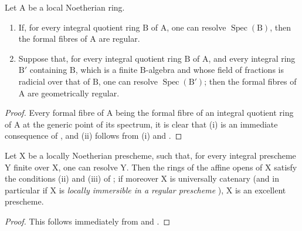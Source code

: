 \begin{corollary}[7.9.4]
\label{IV.7.9.4}
Let $\mathrm{A}$ be a local Noetherian ring.
\begin{enumerate}[label=(\roman*)]
  \item If, for every integral quotient ring $\mathrm{B}$ of $\mathrm{A}$, one can resolve $\operatorname{Spec}(\mathrm{B})$, then the formal fibres of $\mathrm{A}$ are regular.
  \item Suppose that, for every integral quotient ring $\mathrm{B}$ of $\mathrm{A}$, and every integral ring $\mathrm{B}'$ containing $\mathrm{B}$, which is a finite $\mathrm{B}$-algebra and whose field of fractions is radicial over that of $\mathrm{B}$, one can resolve $\operatorname{Spec}(\mathrm{B}')$; then the formal fibres of $\mathrm{A}$ are geometrically regular.
\end{enumerate}
\end{corollary}

\begin{proof}
Every formal fibre of $\mathrm{A}$ being the formal fibre of an integral quotient ring of $\mathrm{A}$ at the generic point of its spectrum, it is clear that (i) is an immediate consequence of , and (ii) follows from (i) and .
\end{proof}

\begin{proposition}[7.9.5]
\label{IV.7.9.5}
Let $\mathrm{X}$ be a locally Noetherian prescheme, such that, for every integral prescheme $\mathrm{Y}$ finite over $\mathrm{X}$, one can resolve $\mathrm{Y}$. Then the rings of the affine opens of $\mathrm{X}$ satisfy the conditions \textup{(ii)} and \textup{(iii)} of ; if moreover $\mathrm{X}$ is universally catenary  \textup{(and}
\textup{in particular if $\mathrm{X}$ is \emph{locally immersible in a regular prescheme} )}, $\mathrm{X}$ is an excellent prescheme.
\end{proposition}

\begin{proof}
This follows immediately from  and .
\end{proof}

